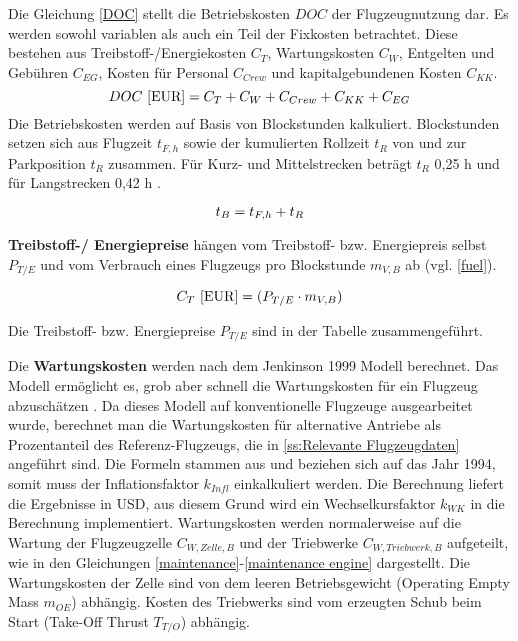 Die Gleichung \eqref{DOC} stellt die Betriebskosten $DOC$ der Flugzeugnutzung dar. 
Es werden sowohl variablen als auch ein Teil der Fixkosten betrachtet.
Diese bestehen aus Treibstoff-/Energiekosten $C_T$, 
Wartungskosten $C_W$, Entgelten und Gebühren $C_{EG}$, 
Kosten für Personal $C_{Crew}$ und kapitalgebundenen Kosten $C_{KK}$.
%
\begin{equation}
     {DOC ~[\text{EUR}]} = C_T + C_W + C_{Crew} + C_{KK} + C_{EG} \\
     \label{DOC}
  \end{equation}
%
Die Betriebskosten werden auf Basis von Blockstunden kalkuliert. 
Blockstunden setzen sich aus Flugzeit $t_{F,h}$ sowie der kumulierten Rollzeit $t_{R}$ 
von und zur Parkposition $t_{R}$ zusammen. 
Für Kurz- und Mittelstrecken beträgt $t_{R}$ {0,25 h} und für Langstrecken 0,42 h \cite{scholz_design_evaluation_doc}.

\begin{equation}
   t_{B} = t_{F,h} + t_{R} \\
   \label{blockzeit}
\end{equation}

\textbf{Treibstoff-/ Energiepreise} hängen vom Treibstoff- bzw. Energiepreis selbst $P_{T/E}$ 
und vom Verbrauch eines Flugzeugs pro Blockstunde $m_{V,B}$ ab (vgl. \eqref{fuel}).

\begin{equation}
   {C_T ~[\text{EUR}]} = (P_{T/E} \cdot m_{V,B}) \\
   \label{fuel}
\end{equation}

Die Treibstoff- bzw. Energiepreise $P_{T/E}$ sind in der Tabelle zusammengeführt.

Die \textbf{Wartungskosten} werden nach dem Jenkinson 1999 Modell berechnet. 
Das Modell ermöglicht es, grob aber schnell die Wartungskosten 
für ein Flugzeug abzuschätzen \cite{bruge2018wartungskosten}.
Da dieses Modell auf konventionelle Flugzeuge ausgearbeitet wurde, 
berechnet man die Wartungskosten für alternative Antriebe als Prozentanteil des Referenz-Flugzeugs, 
die in \ref{ss:Relevante Flugzeugdaten} angeführt sind.
Die Formeln stammen aus \cite{bruge2018wartungskosten} und beziehen sich auf das Jahr 1994, 
somit muss der Inflationsfaktor $k_{Infl}$ einkalkuliert werden. 
Die Berechnung liefert die Ergebnisse in USD, 
aus diesem Grund wird ein Wechselkursfaktor $k_{WK}$ in die Berechnung implementiert.
Wartungskosten werden normalerweise auf die Wartung der Flugzeugzelle $C_{W,Zelle,B}$ 
und der Triebwerke $C_{W,Triebwerk,B}$ aufgeteilt, 
wie in den Gleichungen \eqref{maintenance}-\eqref{maintenance engine} dargestellt. 
Die Wartungskosten der Zelle sind von dem leeren Betriebsgewicht 
(Operating Empty Mass $m_{OE}$) abhängig. 
Kosten des Triebwerks sind vom erzeugten Schub beim Start (Take-Off Thrust $T_{T/O}$) abhängig.


